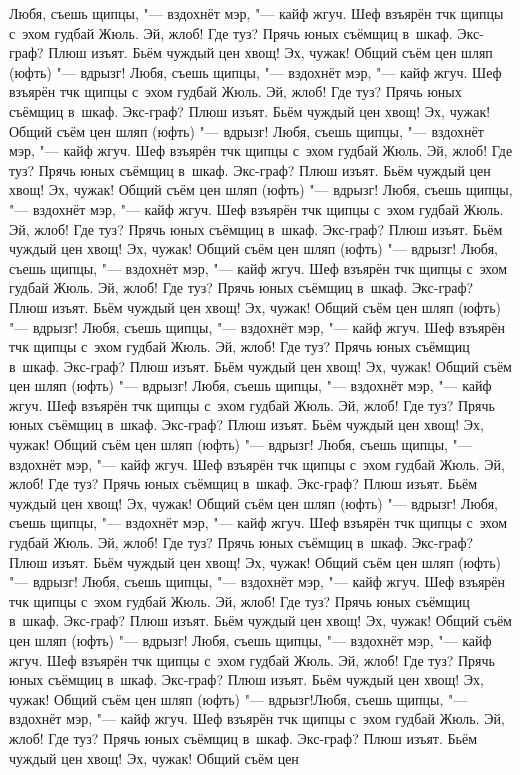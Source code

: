 Любя, съешь щипцы, "--- вздохнёт мэр, "--- кайф жгуч. Шеф взъярён тчк щипцы
с~эхом гудбай Жюль. Эй, жлоб! Где туз? Прячь юных съёмщиц в~шкаф. Экс-граф?
Плюш изъят. Бьём чуждый цен хвощ! Эх, чужак! Общий съём цен шляп (юфть) "---
вдрызг! Любя, съешь щипцы, "--- вздохнёт мэр, "--- кайф жгуч. Шеф взъярён тчк
щипцы с~эхом гудбай Жюль. Эй, жлоб! Где туз? Прячь юных съёмщиц в~шкаф.
Экс-граф? Плюш изъят. Бьём чуждый цен хвощ! Эх, чужак! Общий съём цен шляп
(юфть) "--- вдрызг! Любя, съешь щипцы, "--- вздохнёт мэр, "--- кайф жгуч. Шеф
взъярён тчк щипцы с~эхом гудбай Жюль. Эй, жлоб! Где туз? Прячь юных съёмщиц
в~шкаф. Экс-граф? Плюш изъят. Бьём чуждый цен хвощ! Эх, чужак! Общий съём цен
шляп (юфть) "--- вдрызг! Любя, съешь щипцы, "--- вздохнёт мэр, "--- кайф жгуч.
Шеф взъярён тчк щипцы с~эхом гудбай Жюль. Эй, жлоб! Где туз? Прячь юных съёмщиц
в~шкаф. Экс-граф? Плюш изъят. Бьём чуждый цен хвощ! Эх, чужак! Общий съём цен
шляп (юфть) "--- вдрызг! Любя, съешь щипцы, "--- вздохнёт мэр, "--- кайф жгуч.
Шеф взъярён тчк щипцы с~эхом гудбай Жюль. Эй, жлоб! Где туз? Прячь юных съёмщиц
в~шкаф. Экс-граф? Плюш изъят. Бьём чуждый цен хвощ! Эх, чужак! Общий съём цен
шляп (юфть) "--- вдрызг! Любя, съешь щипцы, "--- вздохнёт мэр, "--- кайф жгуч.
Шеф взъярён тчк щипцы с~эхом гудбай Жюль. Эй, жлоб! Где туз? Прячь юных съёмщиц
в~шкаф. Экс-граф? Плюш изъят. Бьём чуждый цен хвощ! Эх, чужак! Общий съём цен
шляп (юфть) "--- вдрызг! Любя, съешь щипцы, "--- вздохнёт мэр, "--- кайф жгуч.
Шеф взъярён тчк щипцы с~эхом гудбай Жюль. Эй, жлоб! Где туз? Прячь юных съёмщиц
в~шкаф. Экс-граф? Плюш изъят. Бьём чуждый цен хвощ! Эх, чужак! Общий съём цен
шляп (юфть) "--- вдрызг! Любя, съешь щипцы, "--- вздохнёт мэр, "--- кайф жгуч.
Шеф взъярён тчк щипцы с~эхом гудбай Жюль. Эй, жлоб! Где туз? Прячь юных съёмщиц
в~шкаф. Экс-граф? Плюш изъят. Бьём чуждый цен хвощ! Эх, чужак! Общий съём цен
шляп (юфть) "--- вдрызг! Любя, съешь щипцы, "--- вздохнёт мэр, "--- кайф жгуч.
Шеф взъярён тчк щипцы с~эхом гудбай Жюль. Эй, жлоб! Где туз? Прячь юных съёмщиц
в~шкаф. Экс-граф? Плюш изъят. Бьём чуждый цен хвощ! Эх, чужак! Общий съём цен
шляп (юфть) "--- вдрызг! Любя, съешь щипцы, "--- вздохнёт мэр, "--- кайф жгуч.
Шеф взъярён тчк щипцы с~эхом гудбай Жюль. Эй, жлоб! Где туз? Прячь юных съёмщиц
в~шкаф. Экс-граф? Плюш изъят. Бьём чуждый цен хвощ! Эх, чужак! Общий съём цен
шляп (юфть) "--- вдрызг! Любя, съешь щипцы, "--- вздохнёт мэр, "--- кайф жгуч.
Шеф взъярён тчк щипцы с~эхом гудбай Жюль. Эй, жлоб! Где туз? Прячь юных съёмщиц
в~шкаф. Экс-граф? Плюш изъят. Бьём чуждый цен хвощ! Эх, чужак! Общий съём цен
шляп (юфть) "--- вдрызг!Любя, съешь щипцы, "--- вздохнёт мэр, "--- кайф жгуч.
Шеф взъярён тчк щипцы с~эхом гудбай Жюль. Эй, жлоб! Где туз? Прячь юных съёмщиц
в~шкаф. Экс-граф? Плюш изъят. Бьём чуждый цен хвощ! Эх, чужак! Общий съём цен

